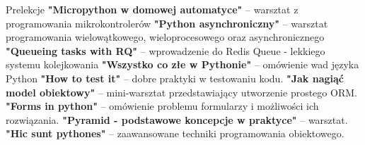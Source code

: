 \begin{rubric}{Prelekcje}
\entry*[PyConPL 2017]\textbf{"Micropython w domowej automatyce"} -- warsztat z
    programowania mikrokontrolerów
\entry*[PyConPL 2015]\textbf{"Python asynchroniczny"} -- warsztat
    programowania wielowątkowego, wieloprocesowego oraz asynchronicznego
\textbf{"Queueing tasks with RQ"} -- wprowadzenie do
    Redis Queue - lekkiego systemu kolejkowania
\entry*[PyConPL 2014]\textbf{"Wszystko co złe w Pythonie"} --
    omówienie wad języka Python
\entry*[PyConPL 2013]\textbf{"How to test it"} -- dobre praktyki w testowaniu
    kodu.
\entry*[4developers 2013]\textbf{"Jak nagiąć model obiektowy"} -- mini-warsztat
    przedstawiający utworzenie prostego ORM.
\entry*[PyConPL 2012]\textbf{"Forms in python"} -- omówienie problemu
    formularzy i możliwości ich rozwiązania.
\entry*[PyconPL 2012]\textbf{"Pyramid - podstawowe koncepcje w praktyce"} --
    warsztat.
\entry*[PyConPL 2011]\textbf{"Hic sunt pythones"} -- zaawansowane techniki
    programowania obiektowego.
\end{rubric}
